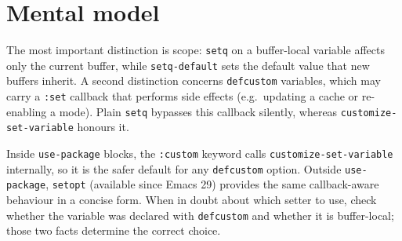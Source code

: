 \section{Mental model}
The most important distinction is scope: \texttt{setq} on a buffer-local variable affects only the current buffer, while \texttt{setq-default} sets the default value that new buffers inherit.  A second distinction concerns \texttt{defcustom} variables, which may carry a \texttt{:set} callback that performs side effects (e.g.\ updating a cache or re-enabling a mode).  Plain \texttt{setq} bypasses this callback silently, whereas \texttt{customize-set-variable} honours it.

Inside \texttt{use-package} blocks, the \texttt{:custom} keyword calls \texttt{customize-set-variable} internally, so it is the safer default for any \texttt{defcustom} option.  Outside \texttt{use-package}, \texttt{setopt} (available since Emacs 29) provides the same callback-aware behaviour in a concise form.  When in doubt about which setter to use, check whether the variable was declared with \texttt{defcustom} and whether it is buffer-local; those two facts determine the correct choice.
